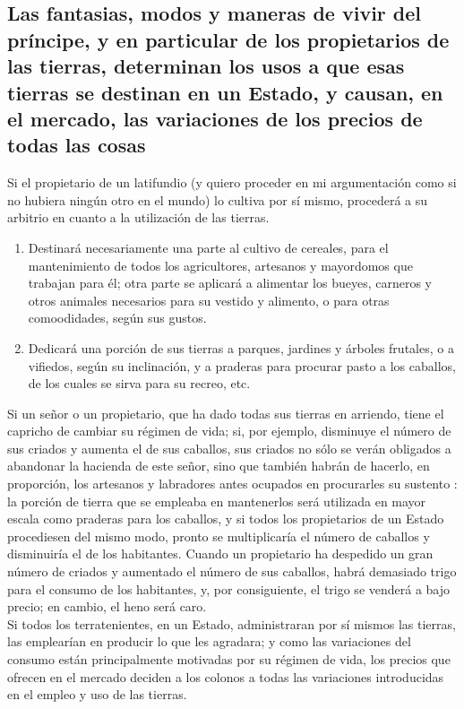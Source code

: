 \documentclass[10pt]{article}
\begin{document}
\begin{multicols}{1}
\section*{Las fantasias, modos y maneras de vivir del príncipe, y en particular de los propietarios de las tierras, determinan los usos a que esas tierras se destinan en un Estado, y causan, en el mercado, las variaciones de los precios de todas las cosas}
Si el propietario de un latifundio (y quiero proceder en mi argumentación como si no hubiera ningún otro en el mundo) lo cultiva por sí mismo, procederá a su arbitrio en cuanto a la utilización de las tierras.\\
\begin{enumerate}
\item Destinará necesariamente una parte al cultivo de cereales, para el mantenimiento de todos los agricultores, artesanos y mayordomos que trabajan para él; otra parte se aplicará a alimentar los bueyes, carneros y otros animales necesarios para su vestido y alimento, o para otras comoodidades, según sus gustos.
\item Dedicará una porción de sus tierras a parques, jardines y árboles frutales, o a vifiedos, según su inclinación, y a praderas para procurar pasto a los caballos, de los cuales se sirva para su recreo, etc.
\end{enumerate}
Si un señor o un propietario, que ha dado todas sus tierras en arriendo, tiene el capricho de cambiar su régimen de vida; si, por ejemplo, disminuye el número de sus criados y aumenta el de sus caballos, sus criados no sólo se verán obligados a abandonar la hacienda de este señor, sino que también habrán de hacerlo, en proporción, los artesanos y labradores antes ocupados en procurarles su sustento : la porción de tierra que se empleaba en mantenerlos será utilizada en mayor escala como praderas para los caballos, y si todos los propietarios de un Estado procediesen del mismo modo, pronto se multiplicaría el número de caballos y disminuiría el de los habitantes. Cuando un propietario ha despedido un gran número de criados y aumentado el número de sus caballos, habrá demasiado trigo para el consumo de los habitantes, y, por consiguiente, el trigo se venderá a bajo precio; en cambio, el heno será caro.\\
Si todos los terratenientes, en un Estado, administraran por sí mismos las tierras, las emplearían en producir lo que les agradara; y como las variaciones del consumo están principalmente motivadas por su régimen de vida, los precios que ofrecen en el mercado deciden a los colonos a todas las variaciones introducidas en el empleo y uso de las tierras.

\end{multicols}
\end{document}
